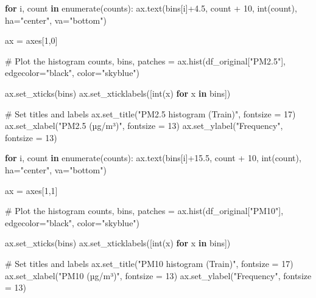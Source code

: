 \documentclass[
  letterpaper,
  DIV=11,
  numbers=noendperiod]{scrartcl}
\newenvironment{Shaded}{\begin{snugshade}}{\end{snugshade}}
\newcommand{\BuiltInTok}[1]{\textcolor[rgb]{0.00,0.23,0.31}{#1}}
\newcommand{\CommentTok}[1]{\textcolor[rgb]{0.37,0.37,0.37}{#1}}
\newcommand{\ControlFlowTok}[1]{\textcolor[rgb]{0.00,0.23,0.31}{\textbf{#1}}}
\newcommand{\DecValTok}[1]{\textcolor[rgb]{0.68,0.00,0.00}{#1}}
\newcommand{\FloatTok}[1]{\textcolor[rgb]{0.68,0.00,0.00}{#1}}
\newcommand{\KeywordTok}[1]{\textcolor[rgb]{0.00,0.23,0.31}{\textbf{#1}}}
\newcommand{\NormalTok}[1]{\textcolor[rgb]{0.00,0.23,0.31}{#1}}
\newcommand{\OperatorTok}[1]{\textcolor[rgb]{0.37,0.37,0.37}{#1}}
\newcommand{\StringTok}[1]{\textcolor[rgb]{0.13,0.47,0.30}{#1}}
\begin{document}
\begin{Shaded}
\begin{Highlighting}[]
\ControlFlowTok{for}\NormalTok{ i, count }\KeywordTok{in} \BuiltInTok{enumerate}\NormalTok{(counts):}
\NormalTok{    ax.text(bins[i]}\OperatorTok{+}\FloatTok{4.5}\NormalTok{, count }\OperatorTok{+} \DecValTok{10}\NormalTok{, }\BuiltInTok{int}\NormalTok{(count), ha}\OperatorTok{=}\StringTok{"center"}\NormalTok{, va}\OperatorTok{=}\StringTok{"bottom"}\NormalTok{)}


\NormalTok{ax }\OperatorTok{=}\NormalTok{ axes[}\DecValTok{1}\NormalTok{,}\DecValTok{0}\NormalTok{]}

\CommentTok{\# Plot the histogram}
\NormalTok{counts, bins, patches }\OperatorTok{=}\NormalTok{ ax.hist(df\_original[}\StringTok{"PM2.5"}\NormalTok{], edgecolor}\OperatorTok{=}\StringTok{"black"}\NormalTok{, color}\OperatorTok{=}\StringTok{"skyblue"}\NormalTok{)}

\NormalTok{ax.set\_xticks(bins)  }
\NormalTok{ax.set\_xticklabels([}\BuiltInTok{int}\NormalTok{(x) }\ControlFlowTok{for}\NormalTok{ x }\KeywordTok{in}\NormalTok{ bins])}

\CommentTok{\# Set titles and labels}
\NormalTok{ax.set\_title(}\StringTok{"PM2.5 histogram (Train)"}\NormalTok{, fontsize }\OperatorTok{=} \DecValTok{17}\NormalTok{)}
\NormalTok{ax.set\_xlabel(}\StringTok{"PM2.5 (µg/m³)"}\NormalTok{, fontsize }\OperatorTok{=} \DecValTok{13}\NormalTok{)}
\NormalTok{ax.set\_ylabel(}\StringTok{"Frequency"}\NormalTok{, fontsize }\OperatorTok{=} \DecValTok{13}\NormalTok{)}

\ControlFlowTok{for}\NormalTok{ i, count }\KeywordTok{in} \BuiltInTok{enumerate}\NormalTok{(counts):}
\NormalTok{    ax.text(bins[i]}\OperatorTok{+}\FloatTok{15.5}\NormalTok{, count }\OperatorTok{+} \DecValTok{10}\NormalTok{, }\BuiltInTok{int}\NormalTok{(count), ha}\OperatorTok{=}\StringTok{"center"}\NormalTok{, va}\OperatorTok{=}\StringTok{"bottom"}\NormalTok{)}

\NormalTok{ax }\OperatorTok{=}\NormalTok{ axes[}\DecValTok{1}\NormalTok{,}\DecValTok{1}\NormalTok{]}

\CommentTok{\# Plot the histogram}
\NormalTok{counts, bins, patches }\OperatorTok{=}\NormalTok{ ax.hist(df\_original[}\StringTok{"PM10"}\NormalTok{], edgecolor}\OperatorTok{=}\StringTok{"black"}\NormalTok{, color}\OperatorTok{=}\StringTok{"skyblue"}\NormalTok{)}

\NormalTok{ax.set\_xticks(bins) }
\NormalTok{ax.set\_xticklabels([}\BuiltInTok{int}\NormalTok{(x) }\ControlFlowTok{for}\NormalTok{ x }\KeywordTok{in}\NormalTok{ bins])}

\CommentTok{\# Set titles and labels}
\NormalTok{ax.set\_title(}\StringTok{"PM10 histogram (Train)"}\NormalTok{, fontsize }\OperatorTok{=} \DecValTok{17}\NormalTok{)}
\NormalTok{ax.set\_xlabel(}\StringTok{"PM10 (µg/m³)"}\NormalTok{, fontsize }\OperatorTok{=} \DecValTok{13}\NormalTok{)}
\NormalTok{ax.set\_ylabel(}\StringTok{"Frequency"}\NormalTok{, fontsize }\OperatorTok{=} \DecValTok{13}\NormalTok{)}


\end{Highlighting}
\end{Shaded}
\end{document}
